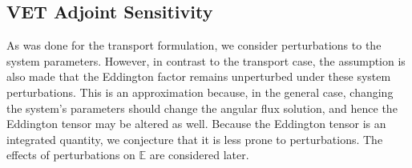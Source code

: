 \documentclass[12pt]{report}
\newcommand{\Edd}{\mathbb{E}}
\begin{document}
\subsection{VET Adjoint Sensitivity}

As was done for the transport formulation, we consider perturbations to the system parameters. However, in contrast to the transport case, the assumption is also made that the Eddington factor remains unperturbed under these system perturbations. This is an approximation because, in the general case, changing the system's parameters should change the angular flux solution, and hence
the Eddington tensor may be altered as well. Because the Eddington tensor is an integrated quantity, we conjecture that it is 
less prone to perturbations. The effects of perturbations on $\Edd$ are considered later.
\end{document}
